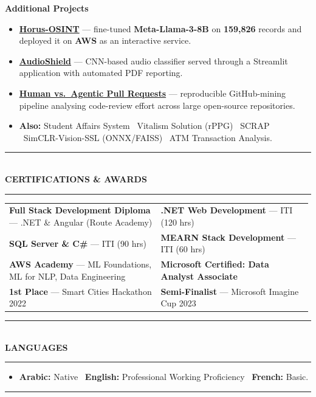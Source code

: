 \documentclass[10pt, a4paper]{article}
\makeatletter
\newcommand{\cvsection}[1]{%
  \vspace{3pt}%
  {\color{navy}\rule{\linewidth}{1.1pt}}\\[0.5pt]%
  {\color{navy}\bfseries\fontsize{9.5}{11}\selectfont\uppercase{#1}}\\[-4pt]%
  {\color{teal}\rule{\linewidth}{0.6pt}}%
  \vspace{2pt}%
}
\newcommand{\cvmini}[2]{\item {\bfseries\color{navy}#1} --- #2}
\newenvironment{cvitems}{%
  \begin{itemize}[leftmargin=11pt, itemsep=0.5pt, parsep=0pt, topsep=1pt,
                  label={\textcolor{teal}{$\bullet$}}]
}{%
  \end{itemize}%
}
\newenvironment{dualcol}{%
  \begin{tabular*}{\linewidth}{@{}p{0.495\linewidth}@{\hspace{0.01\linewidth}}p{0.495\linewidth}@{}}
}{%
  \end{tabular*}%
}
\makeatother
\begin{document}
\vspace{3pt}
{\bfseries\color{navy}Additional Projects}
\begin{cvitems}
  \cvmini{\href{https://github.com/MahmoudAlyosify/Horus-OSINT}{Horus-OSINT}}{fine-tuned \textbf{Meta-Llama-3-8B} on \textbf{159,826} records and deployed it on \textbf{AWS} as an interactive service.}
  \cvmini{\href{https://github.com/MahmoudAlyosify/AudioShield}{AudioShield}}{CNN-based audio classifier served through a Streamlit application with automated PDF reporting.}
  \cvmini{\href{https://github.com/MahmoudAlyosify/Analyzing-Review-Effort-in-Human-vs.-Agentic-Pull-Requests}{Human vs.\ Agentic Pull Requests}}{reproducible GitHub-mining pipeline analysing code-review effort across large open-source repositories.}
  \item \textbf{Also:} Student Affairs System \textperiodcentered\ Vitalism Solution (rPPG) \textperiodcentered\ SCRAP \textperiodcentered\ SimCLR-Vision-SSL (ONNX/FAISS) \textperiodcentered\ ATM Transaction Analysis.
\end{cvitems}

\cvsection{Certifications \& Awards}

\begin{dualcol}
  \textbf{Full Stack Development Diploma} --- .NET \& Angular (Route Academy) &
  \textbf{.NET Web Development} --- ITI (120 hrs) \\[2pt]
  \textbf{SQL Server \& C\#} --- ITI (90 hrs) &
  \textbf{MEARN Stack Development} --- ITI (60 hrs) \\[2pt]
  \textbf{AWS Academy} --- ML Foundations, ML for NLP, Data Engineering &
  \textbf{Microsoft Certified: Data Analyst Associate} \\[2pt]
  \textbf{1st Place} --- Smart Cities Hackathon 2022 &
  \textbf{Semi-Finalist} --- Microsoft Imagine Cup 2023 \\
\end{dualcol}

\cvsection{Languages}

\begin{cvitems}
  \item \textbf{Arabic:} Native \textperiodcentered\ \textbf{English:} Professional Working Proficiency \textperiodcentered\ \textbf{French:} Basic.
\end{cvitems}

\vspace{3pt}
{\color{navy}\rule{\linewidth}{0.8pt}}
\end{document}
